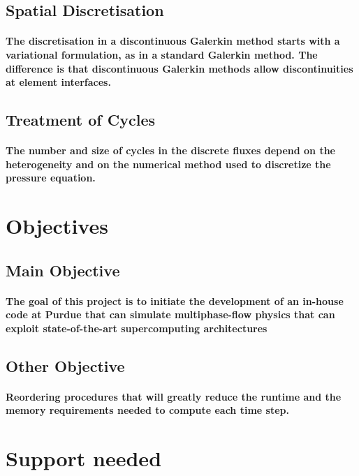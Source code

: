 \documentclass{article}
\begin{document}
	\subsection{Spatial Discretisation}
 	\paragraph{The discretisation in a discontinuous Galerkin method starts with a variational formulation, as in a standard Galerkin method. The difference is that discontinuous Galerkin methods allow discontinuities
	at element interfaces.}
	
\subsection{Treatment of Cycles}
	\paragraph{The number and size of cycles in the discrete fluxes depend on the heterogeneity and on the numerical method used to discretize the pressure equation.}
	
	
\section{Objectives}
          \subsection{Main Objective}
	\paragraph{The goal of this project is to initiate the development of an in-house code at Purdue that can simulate multiphase-flow physics that can exploit state-of-the-art supercomputing architectures}
          \subsection{Other Objective}
	\paragraph{Reordering procedures that will greatly reduce the runtime and the memory requirements needed to compute each time step.}
	

\section{Support needed}
\end{document}
